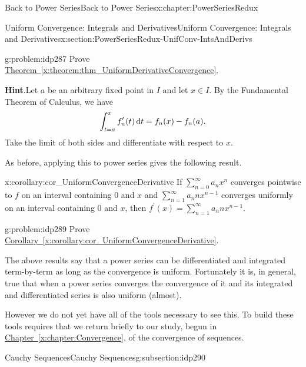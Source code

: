 \begin{chapterptx}{Back to Power Series}{}{Back to Power Series}{}{}{x:chapter:PowerSeriesRedux}
\begin{sectionptx}{Uniform Convergence: Integrals and Derivatives}{}{Uniform Convergence: Integrals and Derivatives}{}{}{x:section:PowerSeriesRedux-UnifConv-IntsAndDerivs}
\begin{introduction}{}
			\begin{problem}{}{g:problem:idp287}%
				Prove \hyperref[x:theorem:thm_UniformDerivativeConvergence]{Theorem~{\xreffont\ref{x:theorem:thm_UniformDerivativeConvergence}}}.%
				\par\smallskip%
				\noindent\textbf{\blocktitlefont Hint}.\hypertarget{g:hint:idp288}{}\quad{}Let \(a\) be an arbitrary fixed point in \(I\) and let \(x\in
				I\).  By the Fundamental Theorem of Calculus, we have%
				\begin{equation*}
					\int_{t=a}^x f^\prime_n(t)\,{\rm d} t=f_n(x)-f_n(a)\text{.}
				\end{equation*}
				Take the limit of both sides and differentiate with respect to \(x\).%
			\end{problem}
			As before, applying this to power series gives the following result.%
			\begin{corollary}{}{}{x:corollary:cor_UniformConvergenceDerivative}%
				If \(\sum_{n=0}^\infty a_nx^n\) converges pointwise to \(f\) on an interval containing \(0\) and \(x\) and \(\sum_{n=1}^\infty a_nnx^{n-1}\) converges uniformly on an interval containing \(0\) and \(x\), then \(f^\prime(x)=\sum_{n=1}^\infty a_nnx^{n-1}\).%
			\end{corollary}
			\begin{problem}{}{g:problem:idp289}%
				 Prove \hyperref[x:corollary:cor_UniformConvergenceDerivative]{Corollary~{\xreffont\ref{x:corollary:cor_UniformConvergenceDerivative}}}.%
			\end{problem}
			The above results say that a power series can be differentiated and integrated term-by-term as long as the convergence is uniform. Fortunately it is, in general, true that when a power series converges the convergence of it and its integrated and differentiated series is also uniform (almost).%
			\par
			However we do not yet have all of the tools necessary to see this. To build these tools requires that we return briefly to our study, begun in \hyperref[x:chapter:Convergence]{Chapter~{\xreffont\ref{x:chapter:Convergence}}}, of the convergence of sequences.%
		\end{introduction}%
		\typeout{************************************************}
		\typeout{************************************************}
		\begin{subsectionptx}{Cauchy Sequences}{}{Cauchy Sequences}{}{}{g:subsection:idp290}

\end{subsectionptx}
\end{sectionptx}
\end{chapterptx}
